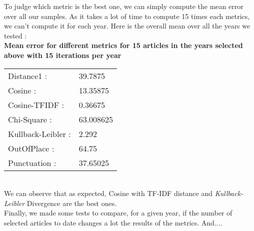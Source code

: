 To judge which metric is the best one, we can simply compute the mean error over all our samples. As it takes a lot of time to compute 15 times each metrics, we can't compute it for each year. Here is the overall mean over all the years we tested :\\

\textbf{Mean error for different metrics for 15 articles in the years selected above with 15 iterations per year}\\
\begin{tabular}{p{3cm} p{5cm}}
    Distance1 :& 39.7875\\
    Cosine :& 13.35875\\
    Cosine-TFIDF :& 0.36675\\
    Chi-Square :& 63.008625\\
    Kullback-Leibler :& 2.292\\
    OutOfPlace :& 64.75\\
    Punctuation :& 37.65025\\
\end{tabular}\\

We can observe that as expected, Cosine with TF-IDF distance and \emph{Kullback-Leibler} Divergence are the best ones.\\

Finally, we made some tests to compare, for a given year, if the number of selected articles to date changes a lot the results of the metrics. And....